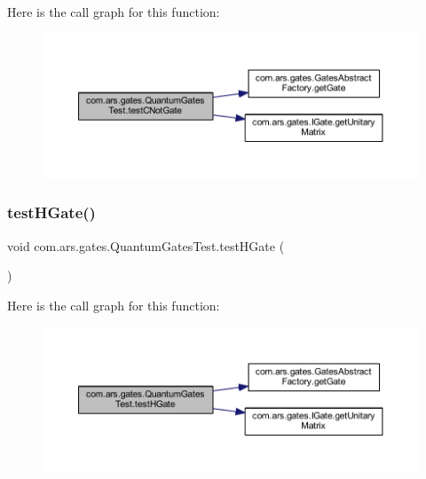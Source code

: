 Here is the call graph for this function\+:\nopagebreak
\begin{figure}[H]
\begin{center}
\leavevmode
\includegraphics[width=350pt]{classcom_1_1ars_1_1gates_1_1_quantum_gates_test_a9b3279f116ab4884f992562072132783_cgraph}
\end{center}
\end{figure}
\hypertarget{classcom_1_1ars_1_1gates_1_1_quantum_gates_test_a92187d5f38a054492896c3fe55ca6de3}{}\label{classcom_1_1ars_1_1gates_1_1_quantum_gates_test_a92187d5f38a054492896c3fe55ca6de3} 
\subsubsection{\texorpdfstring{test\+H\+Gate()}{testHGate()}}
{\footnotesize\ttfamily void com.\+ars.\+gates.\+Quantum\+Gates\+Test.\+test\+H\+Gate (\begin{DoxyParamCaption}{ }\end{DoxyParamCaption})}

Here is the call graph for this function\+:\nopagebreak
\begin{figure}[H]
\begin{center}
\leavevmode
\includegraphics[width=350pt]{classcom_1_1ars_1_1gates_1_1_quantum_gates_test_a92187d5f38a054492896c3fe55ca6de3_cgraph}
\end{center}
\end{figure}
\hypertarget{classcom_1_1ars_1_1gates_1_1_quantum_gates_test_a38b64a39ed314a921858b2b11bfd9b6f}{}\label{classcom_1_1ars_1_1gates_1_1_quantum_gates_test_a38b64a39ed314a921858b2b11bfd9b6f} 

